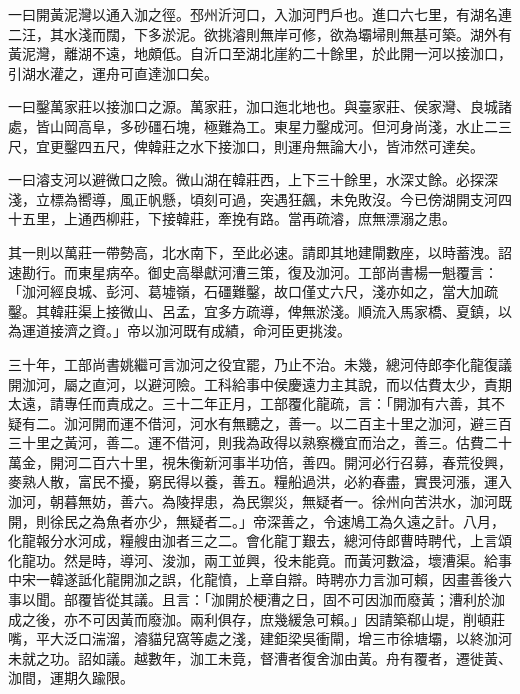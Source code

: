 一曰開黃泥灣以通入泇之徑。邳州沂河口，入泇河門戶也。進口六七里，有湖名連二汪，其水淺而闊，下多淤泥。欲挑濬則無岸可修，欲為壩埽則無基可築。湖外有黃泥灣，離湖不遠，地頗低。自沂口至湖北崖約二十餘里，於此開一河以接泇口，引湖水灌之，運舟可直達泇口矣。

一曰鑿萬家莊以接泇口之源。萬家莊，泇口迤北地也。與臺家莊、侯家灣、良城諸處，皆山岡高阜，多砂礓石塊，極難為工。東星力鑿成河。但河身尚淺，水止二三尺，宜更鑿四五尺，俾韓莊之水下接泇口，則運舟無論大小，皆沛然可達矣。

一曰濬支河以避微口之險。微山湖在韓莊西，上下三十餘里，水深丈餘。必探深淺，立標為嚮導，風正帆懸，頃刻可過，突遇狂飆，未免敗沒。今已傍湖開支河四十五里，上通西柳莊，下接韓莊，牽挽有路。當再疏濬，庶無漂溺之患。

其一則以萬莊一帶勢高，北水南下，至此必速。請即其地建閘數座，以時蓄洩。詔速勘行。而東星病卒。御史高舉獻河漕三策，復及泇河。工部尚書楊一魁覆言：「泇河經良城、彭河、葛墟嶺，石礓難鑿，故口僅丈六尺，淺亦如之，當大加疏鑿。其韓莊渠上接微山、呂孟，宜多方疏導，俾無淤淺。順流入馬家橋、夏鎮，以為運道接濟之資。」帝以泇河既有成績，命河臣更挑浚。

三十年，工部尚書姚繼可言泇河之役宜罷，乃止不治。未幾，總河侍郎李化龍復議開泇河，屬之直河，以避河險。工科給事中侯慶遠力主其說，而以估費太少，責期太遠，請專任而責成之。三十二年正月，工部覆化龍疏，言：「開泇有六善，其不疑有二。泇河開而運不借河，河水有無聽之，善一。以二百主十里之泇河，避三百三十里之黃河，善二。運不借河，則我為政得以熟察機宜而治之，善三。估費二十萬金，開河二百六十里，視朱衡新河事半功倍，善四。開河必行召募，春荒役興，麥熟人散，富民不擾，窮民得以養，善五。糧船過洪，必約春盡，實畏河漲，運入泇河，朝暮無妨，善六。為陵捍患，為民禦災，無疑者一。徐州向苦洪水，泇河既開，則徐民之為魚者亦少，無疑者二。」帝深善之，令速鳩工為久遠之計。八月，化龍報分水河成，糧艘由泇者三之二。會化龍丁艱去，總河侍郎曹時聘代，上言頌化龍功。然是時，導河、浚泇，兩工並興，役未能竟。而黃河數溢，壞漕渠。給事中宋一韓遂詆化龍開泇之誤，化龍憤，上章自辯。時聘亦力言泇可賴，因畫善後六事以聞。部覆皆從其議。且言：「泇開於梗漕之日，固不可因泇而廢黃；漕利於泇成之後，亦不可因黃而廢泇。兩利俱存，庶幾緩急可賴。」因請築郗山堤，削頓莊嘴，平大泛口湍溜，濬貓兒窩等處之淺，建鉅梁吳衝閘，增三市徐塘壩，以終泇河未就之功。詔如議。越數年，泇工未竟，督漕者復舍泇由黃。舟有覆者，遷徙黃、泇間，運期久踰限。

